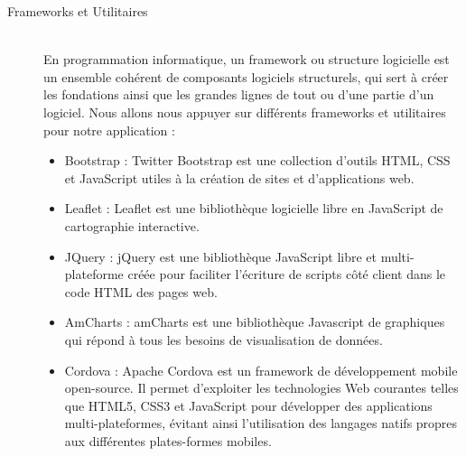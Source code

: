 \begin{description}
  \item[Frameworks et Utilitaires] \hfill \\
    En programmation informatique, un framework ou structure logicielle est un ensemble cohérent de composants logiciels structurels, qui sert à créer les fondations ainsi que les grandes lignes de tout ou d’une partie d'un logiciel. Nous allons nous appuyer sur différents frameworks et utilitaires pour notre application :
    \begin{itemize}
      \item Bootstrap : Twitter Bootstrap est une collection d'outils HTML, CSS et JavaScript utiles à la création de sites et d'applications web.
      \item Leaflet : Leaflet est une bibliothèque logicielle libre en JavaScript de cartographie interactive.
      \item JQuery : jQuery est une bibliothèque JavaScript libre et multi-plateforme créée pour faciliter l'écriture de scripts côté client dans le code HTML des pages web.
      \item AmCharts : amCharts est une bibliothèque Javascript de graphiques qui répond à tous les besoins de visualisation de données.
      \item Cordova : Apache Cordova est un framework de développement mobile open-source. Il permet d'exploiter les technologies Web courantes telles que HTML5, CSS3 et JavaScript pour développer des applications multi-plateformes, évitant ainsi l'utilisation des langages natifs propres aux différentes plates-formes mobiles.
    \end{itemize}

\end{description}







